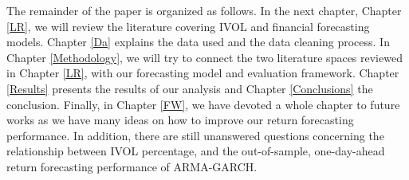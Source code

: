 The remainder of the paper is organized as follows. In the next chapter, Chapter \ref{LR}, we will review the literature covering IVOL and financial forecasting models. Chapter \ref{Da} explains the data used and the data cleaning process. In Chapter \ref{Methodology}, we will try to connect the two literature spaces reviewed in Chapter \ref{LR}, with our forecasting model and evaluation framework. Chapter \ref{Results} presents the results of our analysis and Chapter \ref{Conclusions} the conclusion. Finally, in Chapter \ref{FW}, we have devoted a whole chapter to future works as we have many ideas on how to improve our return forecasting performance. In addition, there are still unanswered questions concerning the relationship between IVOL percentage, and the out-of-sample, one-day-ahead return forecasting performance of ARMA-GARCH.

